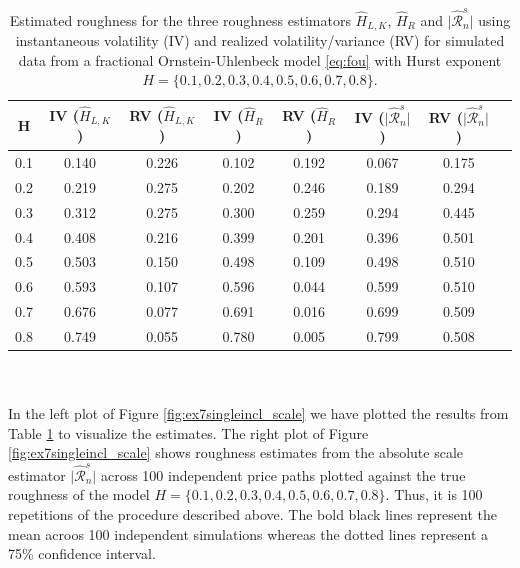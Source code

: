 \documentclass{article}
\begin{document}
\begin{table}[htbp]
    \centering
    \begin{tabular}{cccccccc}
        \toprule
        H & IV ($\widehat{H}_{L,K}$) & RV ($\widehat{H}_{L,K}$) & IV ($\widehat{H}_{R}$) & RV ($\widehat{H}_{R}$) & IV ($\lvert \widehat{\mathscr{R}}_n^s\rvert$) & RV ($\lvert \widehat{\mathscr{R}}_n^s\rvert$)\\
        \midrule
        0.1 & 0.140 & 0.226 & 0.102 & 0.192 & 0.067 & 0.175\\
        0.2 & 0.219 & 0.275 & 0.202 & 0.246 & 0.189 & 0.294\\
        0.3 & 0.312 & 0.275 & 0.300 & 0.259 & 0.294 & 0.445\\
        0.4 & 0.408 & 0.216 & 0.399 & 0.201 & 0.396 & 0.501\\
        0.5 & 0.503 & 0.150 & 0.498 & 0.109 & 0.498 & 0.510\\
        0.6 & 0.593 & 0.107 & 0.596 & 0.044 & 0.599 & 0.510\\
        0.7 & 0.676 & 0.077 & 0.691 & 0.016 & 0.699 & 0.509\\
        0.8 & 0.749 & 0.055 & 0.780 & 0.005 & 0.799 & 0.508\\
        \bottomrule
    \end{tabular}
    \caption{Estimated roughness for the three roughness estimators $\widehat{H}_{L,K}$, $\widehat{H}_R$ and $\lvert \widehat{\mathscr{R}}_n^s\rvert$ using instantaneous volatility (IV) and realized volatility/variance (RV) for simulated data from a fractional Ornstein-Uhlenbeck model \eqref{eq:fou} with Hurst exponent $H=\{0.1,0.2,0.3,0.4,0.5,0.6,0.7,0.8\}$.}
    \label{tab:ex7tableincl_scale}
\end{table}\\\\
In the left plot of Figure \ref{fig:ex7singleincl_scale} we have plotted the results from Table \ref{tab:ex7tableincl_scale} to visualize the estimates. The right plot of Figure \ref{fig:ex7singleincl_scale} shows roughness estimates from the absolute scale estimator $\lvert \widehat{\mathscr{R}}_n^s\rvert$ across 100 independent price paths plotted against the true roughness of the model $H=\{0.1,0.2,0.3,0.4,0.5,0.6,0.7,0.8\}$. Thus, it is 100 repetitions of the procedure described above. The bold black lines represent the mean acroos 100 independent simulations whereas the dotted lines represent a 75\% confidence interval. 
\end{document}
